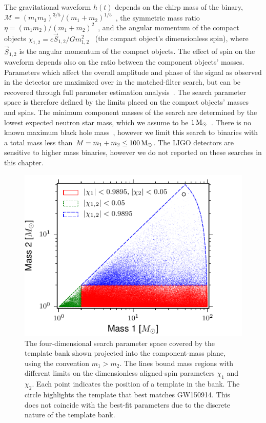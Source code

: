 The gravitational waveform $h(t)$ depends on the chirp mass of the binary,
$\mathcal{M} = (m_1 m_2)^{3/5} /
(m_1+m_2)^{1/5}$~\cite{PhysRev.131.435,Peters:1964}, the symmetric mass ratio
$\eta = (m_1 m_2) / (m_1 + m_2)^2$~\cite{Blanchet:1995ez}, and the angular
momentum of the compact objects $\chi_{1,2} = c{\vec{
S}}_{1,2}/Gm_{1,2}^2$~\cite{Kidder:1992fr,Kidder:1995zr} (the compact object's
dimensionless spin), where ${\vec{S}}_{1,2}$ is the angular momentum of the
compact objects. The effect of spin on the waveform depends also on the ratio
between the component objects' masses.  Parameters which affect the overall
amplitude and phase of the signal as observed in the detector are maximized
over in the matched-filter search, but can be recovered through full parameter
estimation analysis~\cite{GW150914-PARAMESTIM}.  The search parameter space is
therefore defined by the limits placed on the compact objects' masses and
spins.  The minimum component masses of the search are determined by the
lowest expected neutron star mass, which we assume to be
$1\,\mathrm{M}_\odot$~\cite{Miller:2014aaa}. There is no known maximum black hole
mass~\cite{Belczynski:2014iua}, however we limit this search to binaries with
a total mass less than $M = m_1 + m_2 \le 100\,\mathrm{M}_\odot$. The LIGO detectors
are sensitive to higher mass binaries, however we do not reported on these searches
in this chapter.
\begin{figure}[t]
\centering
\includegraphics[width=\textwidth]{figs/chapter2/uberbank_boundaries.pdf}
\caption{The four-dimensional search parameter space covered by the template
bank shown projected into the component-mass plane, using the convention 
$m_1 > m_2$. The lines bound mass regions with different limits on the
dimensionless aligned-spin parameters $\chi_1$ and $\chi_2$. Each point
indicates the position of a template in the bank. The circle highlights the
template that best matches GW150914. This does not coincide with the best-fit
parameters due to the discrete nature of the template bank.
\label{fig:uberbank_boundaries}}
\end{figure}

